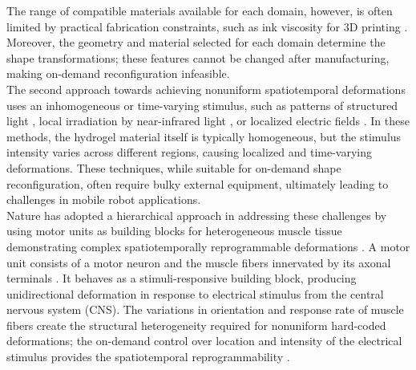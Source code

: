 The range of compatible materials available for each domain, however, is often limited by practical fabrication constraints, such as ink viscosity for 3D printing . Moreover, the geometry and material selected for each domain determine the shape transformations; these features cannot be changed after manufacturing, making on-demand reconfiguration infeasible.\\

The second approach towards achieving nonuniform spatiotemporal deformations uses an inhomogeneous or time-varying stimulus, such as patterns of structured light , local irradiation by near-infrared light , or localized electric fields . In these methods, the hydrogel material itself is typically homogeneous, but the stimulus intensity varies across different regions, causing localized and time-varying deformations. These techniques, while suitable for on-demand shape reconfiguration, often require bulky external equipment, ultimately leading to challenges in mobile robot applications.\\

Nature has adopted a hierarchical approach in addressing these challenges by using motor units as building blocks for heterogeneous muscle tissue demonstrating complex spatiotemporally reprogrammable deformations  . A motor unit consists of a motor neuron and the muscle fibers innervated by its axonal terminals .
It behaves as a stimuli-responsive building block, producing unidirectional deformation in response to electrical stimulus from the central nervous system (CNS). 
The variations in orientation   and response rate  of muscle fibers create the structural heterogeneity  required for nonuniform hard-coded deformations; the on-demand control over location and intensity of the electrical stimulus provides the spatiotemporal reprogrammability .\\
 
